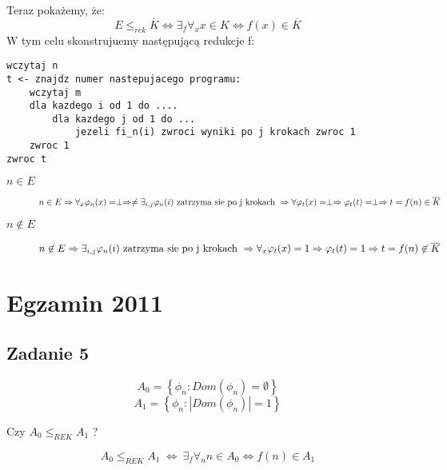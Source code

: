 \documentclass[svgnames]{report}
\begin{document}
Teraz pokażemy, że:
\begin{equation}
E \leqslant_{rek} \overline{K} \Leftrightarrow \exists_f \forall_{x} x \in K \Leftrightarrow f(x) \in \overline{K}
\end{equation}
W tym celu skonstrujuemy następującą redukcje f:
\begin{lstlisting}
wczytaj n
t <- znajdz numer nastepujacego programu:
	wczytaj m
	dla kazdego i od 1 do ....
		dla kazdego j od 1 do ...
			jezeli fi_n(i) zwroci wyniki po j krokach zwroc 1
	zwroc 1	
zwroc t
\end{lstlisting}
\begin{description}
	\item[$n \in E$]
		\begin{equation*}
			n \in E \Rightarrow \forall_x \varphi_n(x) = \perp \Rightarrow \neq \exists_{i,j} \varphi_n(i) \hbox{ zatrzyma sie po j krokach } \Rightarrow \forall \varphi_t(x) = \perp \Rightarrow \varphi_t(t) = \perp \Rightarrow t = f(n) \in \overline{K}
		\end{equation*}
	\item[$n \not\in E$]
		\begin{equation*}
			n \not\in E \Rightarrow \exists_{i,j} \varphi_n(i) \hbox{ zatrzyma sie po j krokach } \Rightarrow \forall_x \varphi_t(x) = 1 \Rightarrow \varphi_t(t) = 1 \Rightarrow t = f(n) \not\in \overline{K}
		\end{equation*}
\end{description}

\chapter{Egzamin 2011}
\section{Zadanie 5}
\begin{framed}
\begin{equation*}
A_0 = \left\{ \phi_n : Dom(\phi_n) = \emptyset \right\}
\end{equation*}
\begin{equation*}
A_1 = \left\{ \phi_n : |Dom(\phi_n)| = 1 \right\}
\end{equation*}

Czy $A_0 \leqslant_{REK} A_1$ ?
\end{framed}

\begin{equation*}
A_0 \leqslant_{REK} A_1 \ \Leftrightarrow \ \exists_f \forall_n n \in A_0 \Leftrightarrow f(n) \in A_1
\end{equation*}
\end{document}
